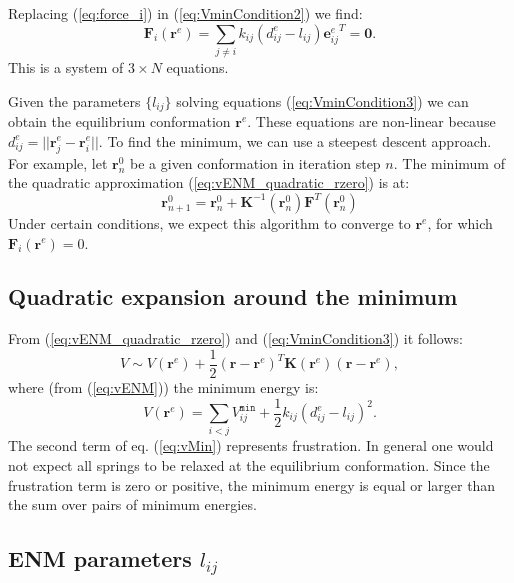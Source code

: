 \documentclass[12pt]{article}
\newcommand{\lij}{l_{ij}}
\newcommand{\kij}{k_{ij}}
\newcommand{\vijMin}{V^{\mathtt{min}}_{ij}}
\newcommand{\dijEq}{d_{ij}^{e}}
\newcommand{\rvector}{\mathbf{r}}
\newcommand{\rvectorEq}{\mathbf{r}^{e}}
\newcommand{\rvectorZero}{\mathbf{r}^0}
\newcommand{\riEq}{\mathbf{r}_i^{e}}
\newcommand{\rjEq}{\mathbf{r}_j^{e}}
\newcommand{\kmat}{\mathbf{K}}
\newcommand{\eij}{\mathbf{e}_{ij}}
\newcommand{\eijEq}{\eij^{e}}
\begin{document}
Replacing (\ref{eq:force_i}) in (\ref{eq:VminCondition2}) we find:
\begin{equation} \label{eq:VminCondition3}
	\mathbf{F}_i(\rvectorEq)
    = \sum_{j \neq i} \kij (\dijEq - \lij) {\eijEq}^T 
    = \mathbf{0}.
\end{equation}
This is a system of $3 \times N$ equations. 

Given the parameters $\{\lij\}$ solving equations (\ref{eq:VminCondition3}) we can obtain the equilibrium conformation $\rvectorEq$. 
These equations are non-linear because $\dijEq = ||\rjEq - \riEq||$. To find the minimum, we can use a steepest descent approach. For example, let $\rvectorZero_{n}$ be a given conformation in iteration step $n$. The minimum of the quadratic approximation (\ref{eq:vENM_quadratic_rzero}) is at:
\begin{equation}
\rvectorZero_{n+1} = \rvectorZero_{n} + \kmat^{-1}(\rvectorZero_{n}) \mathbf{F}^T(\rvectorZero_{n})
\end{equation}
Under certain conditions, we expect this algorithm to converge to $\rvectorEq$, for which $\mathbf{F}_i(\rvectorEq) = 0$.



\subsection{Quadratic expansion around the minimum}

From (\ref{eq:vENM_quadratic_rzero}) and (\ref{eq:VminCondition3}) it follows:
\begin{equation} \label{eq:vENM_quadratic_rEq}
\boxed{
V \sim 
	V(\rvectorEq) +
	\frac{1}{2} (\rvector - \rvectorEq)^T \kmat(\rvectorEq) (\rvector - \rvectorEq),
}
\end{equation}
where (from   (\ref{eq:vENM}))  the minimum energy is:
\begin{equation}
\label{eq:vMin}
\boxed{
V(\rvectorEq) =  \sum_{i<j} \vijMin +\frac{1}{2}\kij (\dijEq-\lij)^2.
}
\end{equation}
The second term of eq. (\ref{eq:vMin}) represents frustration. In general one would not expect all springs to be relaxed at the equilibrium conformation. Since the frustration term is zero or positive, the minimum energy is equal or larger than the sum over pairs of minimum energies. 

\subsection{ENM parameters $\lij$}
\end{document}
